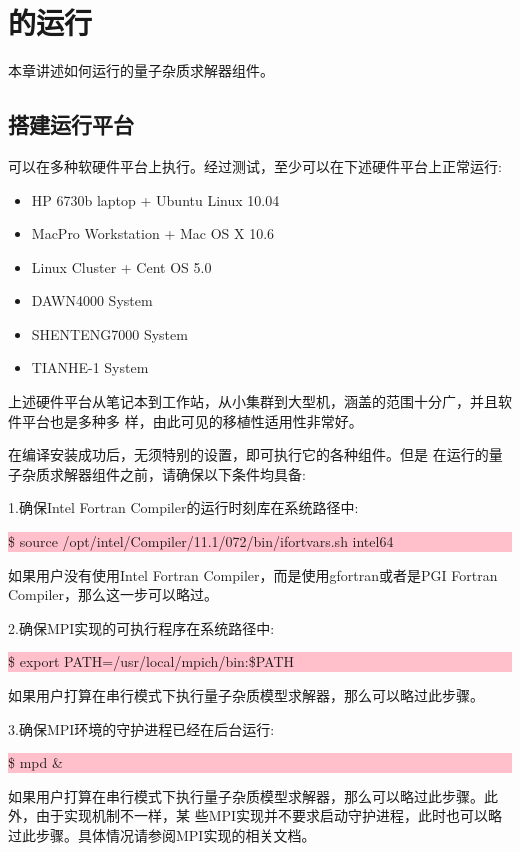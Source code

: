 \chapter{{\iqist}的运行}
\label{chap:run}

本章讲述如何运行{\iqist}的量子杂质求解器组件。

\section{搭建{\iqist}运行平台}
\label{sec:platform}

{\iqist}可以在多种软硬件平台上执行。经过测试，{\iqist}至少可以在下述硬件平台上正常运行:
\begin{itemize}
\item HP 6730b laptop + Ubuntu Linux 10.04
\item MacPro Workstation + Mac OS X 10.6
\item Linux Cluster + Cent OS 5.0
\item DAWN4000 System
\item SHENTENG7000 System
\item TIANHE-1 System
\end{itemize}
上述硬件平台从笔记本到工作站，从小集群到大型机，涵盖的范围十分广，并且软件平台也是多种多
样，由此可见{\iqist}的移植性适用性非常好。

在编译安装成功{\iqist}后，无须特别的设置，即可执行它的各种组件。但是
在运行{\iqist}的量子杂质求解器组件之前，请确保以下条件均具备:

1.确保Intel Fortran Compiler的运行时刻库在系统路径中:

\noindent\colorbox{pink}{\parbox[r]{\linewidth}{\quad \$ source /opt/intel/Compiler/11.1/072/bin/ifortvars.sh intel64}}

如果用户没有使用Intel Fortran Compiler，而是使用gfortran或者是PGI Fortran Compiler，那么这一步可以略过。

2.确保MPI实现的可执行程序在系统路径中:

\noindent\colorbox{pink}{\parbox[r]{\linewidth}{\quad \$ export PATH=/usr/local/mpich/bin:\$PATH}}

如果用户打算在串行模式下执行量子杂质模型求解器，那么可以略过此步骤。

3.确保MPI环境的守护进程已经在后台运行:

\noindent\colorbox{pink}{\parbox[r]{\linewidth}{\quad \$ mpd \&}}

如果用户打算在串行模式下执行量子杂质模型求解器，那么可以略过此步骤。此外，由于实现机制不一样，某
些MPI实现并不要求启动守护进程，此时也可以略过此步骤。具体情况请参阅MPI实现的相关文档。


